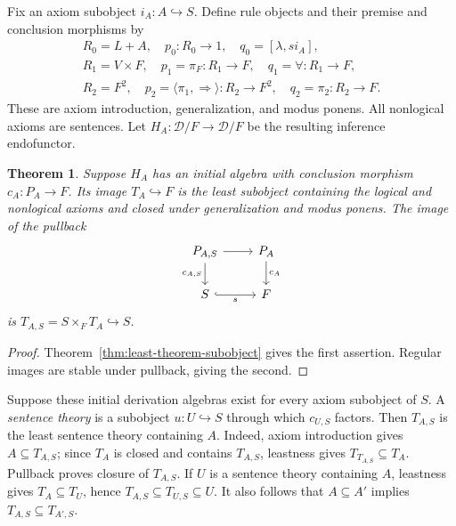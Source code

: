\documentclass[11pt]{article}
\newtheorem{theorem}{Theorem}[section]
\theoremstyle{definition}\newtheorem{definition}[theorem]{Definition}
\begin{document}
Fix an axiom subobject $i_A:A\hookrightarrow S$. Define rule objects
and their premise and conclusion morphisms by
\begin{gather*}
 R_0=L+A,\quad p_0:R_0\to1,\quad q_0=[\lambda,si_A],\\
 R_1=V\times F,\quad p_1=\pi_F:R_1\to F,
             \quad q_1=\forall:R_1\to F,\\
 R_2=F^2,\quad p_2=\langle\pi_1,\Rightarrow\rangle:R_2\to F^2,
             \quad q_2=\pi_2:R_2\to F.
\end{gather*}
These are axiom introduction, generalization, and modus ponens.
All nonlogical axioms are sentences. Let $H_A:\mathcal D/F\to
\mathcal D/F$ be the resulting inference endofunctor.

\begin{theorem}\label{thm:first-order-theory}
Suppose $H_A$ has an initial algebra with conclusion morphism
$c_A:P_A\to F$. Its image $T_A\hookrightarrow F$ is the least
subobject containing the logical and nonlogical axioms and closed
under generalization and modus ponens. The image of the pullback
\[
\begin{tikzcd}
 P_{A,S}\arrow[r]\arrow[d,"c_{A,S}"'] & P_A\arrow[d,"c_A"]\\
 S\arrow[r,hook,"s"'] & F
\end{tikzcd}
\]
is $T_{A,S}=S\times_F T_A\hookrightarrow S$.
\end{theorem}
\begin{proof}
Theorem~\ref{thm:least-theorem-subobject} gives the first assertion.
Regular images are stable under pullback, giving the second.
\end{proof}

Suppose these initial derivation algebras exist for every axiom
subobject of $S$. A \emph{sentence theory} is a subobject
$u:U\hookrightarrow S$ through which $c_{U,S}$ factors.
Then $T_{A,S}$ is the least sentence theory containing $A$.
Indeed, axiom introduction gives $A\subseteq T_{A,S}$; since $T_A$
is closed and contains $T_{A,S}$, leastness gives
$T_{T_{A,S}}\subseteq T_A$. Pullback proves closure of $T_{A,S}$.
If $U$ is a sentence theory containing $A$, leastness gives
$T_A\subseteq T_U$, hence
$T_{A,S}\subseteq T_{U,S}\subseteq U$.
It also follows that $A\subseteq A'$ implies
$T_{A,S}\subseteq T_{A',S}$.
\end{document}
